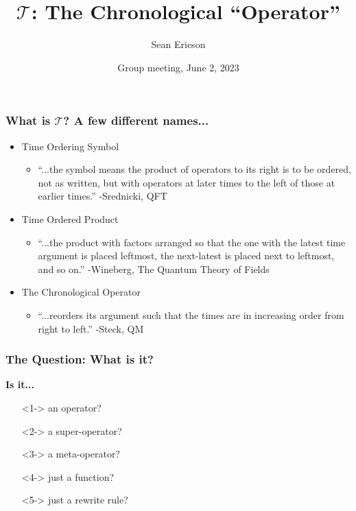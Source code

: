 \documentclass{beamer}
\title{$\mathscr{T}$: The Chronological ``Operator''}
\author{Sean Ericson}
\institute{UO}
\date{Group meeting, June 2, 2023}
\begin{document}
\frame{\titlepage}

\begin{frame}
\frametitle{What is $\mathscr{T}$? A few different names...}
\begin{itemize}
    \item<1-> Time Ordering Symbol
    \begin{itemize}
        \item<1-> ``...the symbol means the product of operators to its right is to be ordered, not as written, but with operators at later times to the left of those at earlier times.'' -Srednicki, QFT
    \end{itemize}
    \item<2-> Time Ordered Product
    \begin{itemize}
        \item<2-> ``...the product with factors arranged so that the one with the latest time argument is placed leftmost, the next-latest is placed next to leftmost, and so on.'' -Wineberg, The Quantum Theory of Fields
    \end{itemize}
    \item<3-> The Chronological Operator
    \begin{itemize}
        \item ``...reorders its argument such that the times are in increasing order from right to left.'' -Steck, QM
    \end{itemize}
\end{itemize}
\end{frame}

\begin{frame}
\frametitle{The Question: What is it?}
    \alert{\textbf{Is it...}}
    \begin{itemize}
        \item[\textbullet]<1-> an operator?
        \item[\textbullet]<2-> a super-operator?
        \item[\textbullet]<3-> a meta-operator?
        \item[\textbullet]<4-> just a function?
        \item[\textbullet]<5-> just a rewrite rule? 
    \end{itemize}
\end{frame}
\end{document}
